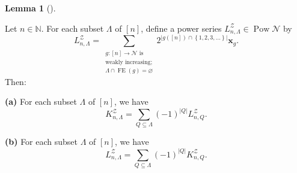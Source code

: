 \documentclass[numbers=enddot,12pt,final,onecolumn,notitlepage]{scrartcl}%
\theoremstyle{definition}
\newtheorem{lem}[theo]{Lemma}
\newenvironment{lemma}[1][]
{\begin{lem}[#1]\begin{leftbar}}
{\end{leftbar}\end{lem}}
\let\sumnonlimits\sum
\renewcommand{\sum}{\sumnonlimits\limits}
\begin{document}
\begin{lemma}
\label{lem.KnL.iex}Let $n\in\mathbb{N}$. For each subset $\Lambda$ of $\left[
n\right]  $, define a power series $L_{n,\Lambda}^{\mathcal{Z}}\in
\operatorname*{Pow}\mathcal{N}$ by%
\begin{equation}
L_{n,\Lambda}^{\mathcal{Z}}=\sum_{\substack{g:\left[  n\right]  \rightarrow
\mathcal{N}\text{ is}\\\text{weakly increasing;}\\\Lambda\cap
\operatorname*{FE}\left(  g\right)  =\varnothing}}2^{\left\vert g\left(
\left[  n\right]  \right)  \cap\left\{  1,2,3,\ldots\right\}  \right\vert
}\mathbf{x}_{g}. \label{eq.lem.KnL.iex.defL}%
\end{equation}
Then:

\textbf{(a)} For each subset $\Lambda$ of $\left[  n\right]  $, we have%
\[
K_{n,\Lambda}^{\mathcal{Z}}=\sum_{Q\subseteq\Lambda}\left(  -1\right)
^{\left\vert Q\right\vert }L_{n,Q}^{\mathcal{Z}}.
\]


\textbf{(b)} For each subset $\Lambda$ of $\left[  n\right]  $, we have%
\[
L_{n,\Lambda}^{\mathcal{Z}}=\sum_{Q\subseteq\Lambda}\left(  -1\right)
^{\left\vert Q\right\vert }K_{n,Q}^{\mathcal{Z}}.
\]

\end{lemma}
\end{document}
